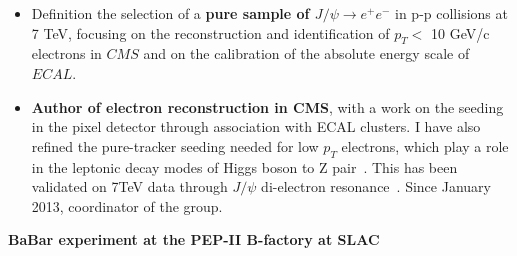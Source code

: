 \documentclass[11pt,twoside,a4paper]{article}
\begin{document}
\begin{enumerate}
\begin {itemize}
  \item Definition the selection of a {\bf pure sample of $J/\psi\to
    e^+e^-$} in p-p collisions at 7 TeV, focusing on the
    reconstruction and identification of $p_T<$ 10 GeV/c electrons in
    $CMS$ and on the calibration of the absolute energy scale of
    $ECAL$. 

  \item {\bf Author of electron reconstruction in CMS}, with a work on
    the seeding in the pixel detector through association with ECAL
    clusters. I have also refined the pure-tracker seeding needed for
    low $p_T$ electrons, which play a role in the leptonic decay modes
    of Higgs boson to Z pair~\cite{pas_recoelectrons,AN_2009_164}.
    This has been validated on 7TeV data through $J/\psi$ di-electron
    resonance~\cite{AN_2010_443}. Since January 2013,
    coordinator of the group.
    
  \end{itemize}
\end{enumerate}



\begin{center}
  {\bf BaBar experiment at the PEP-II B-factory at SLAC}
\end{center}
\end{document}
